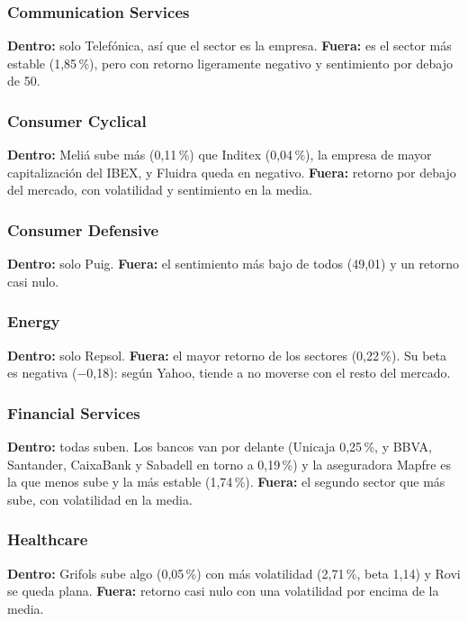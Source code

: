 \documentclass[11pt,a4paper]{article}
\begin{document}
\subsubsection*{Communication Services}
\textbf{Dentro:} solo Telefónica, así que el sector es la empresa. \textbf{Fuera:} es el sector más estable (1,85\,\%), pero con retorno ligeramente negativo y sentimiento por debajo de 50.

\subsubsection*{Consumer Cyclical}
\textbf{Dentro:} Meliá sube más (0,11\,\%) que Inditex (0,04\,\%), la empresa de mayor capitalización del IBEX, y Fluidra queda en negativo. \textbf{Fuera:} retorno por debajo del mercado, con volatilidad y sentimiento en la media.

\subsubsection*{Consumer Defensive}
\textbf{Dentro:} solo Puig. \textbf{Fuera:} el sentimiento más bajo de todos (49,01) y un retorno casi nulo.

\subsubsection*{Energy}
\textbf{Dentro:} solo Repsol. \textbf{Fuera:} el mayor retorno de los sectores (0,22\,\%). Su beta es negativa ($-$0,18): según Yahoo, tiende a no moverse con el resto del mercado.

\subsubsection*{Financial Services}
\textbf{Dentro:} todas suben. Los bancos van por delante (Unicaja 0,25\,\%, y BBVA, Santander, CaixaBank y Sabadell en torno a 0,19\,\%) y la aseguradora Mapfre es la que menos sube y la más estable (1,74\,\%). \textbf{Fuera:} el segundo sector que más sube, con volatilidad en la media.

\subsubsection*{Healthcare}
\textbf{Dentro:} Grifols sube algo (0,05\,\%) con más volatilidad (2,71\,\%, beta 1,14) y Rovi se queda plana. \textbf{Fuera:} retorno casi nulo con una volatilidad por encima de la media.
\end{document}
